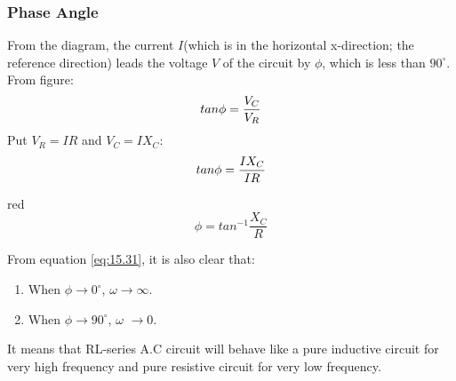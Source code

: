 \subsubsection{Phase Angle}
From the diagram, the current $I$(which is in the horizontal
x-direction; the reference direction) leads the voltage $V$ of the
circuit by $\phi$, which is less than $90^{\circ}$.
From figure:
\begin{equation}\notag
    tan \phi =\frac{V_{C}}{V_{R}}
\end{equation}
Put $V_{R}=IR$ and $V_{C}=IX_{C}$:
\begin{equation}\notag
    tan \phi =\frac{IX_{C}}{IR}
\end{equation}
\begin{mybox}{red}{}
\begin{equation}\label{eq:15.32}
    \phi =tan^{-1}\frac{X_{C}}{R}
\end{equation}
\end{mybox}
\noindent From equation \ref{eq:15.31}, it is also clear that:
\begin{enumerate}[label = (\roman*)]
    \item When $\phi\rightarrow 0^{\circ}$, $\omega\rightarrow\infty$.
    \item When $\phi\rightarrow 90^{\circ}$, $\omega$ $\rightarrow 0$.
\end{enumerate}
It means that RL-series A.C circuit will behave like a pure inductive
circuit for very high frequency and pure resistive circuit for very
low frequency.

